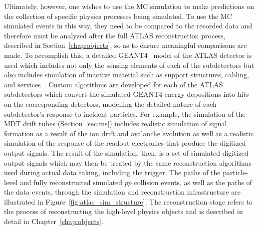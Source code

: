 Ultimately, however, one wishes to use the MC simulation to make predictions on the collection of specific physics
processes being simulated.
To use the MC simulated events in this way, they need to be compared to the recorded data and therefore must be analyzed after
the full ATLAS reconstruction process, described in Section~\ref{chap:objects}, so as to ensure meaningful comparisons are made.
To accomplish this, a detailed \textsc{GEANT4}~\cite{GEANT4} model of the ATLAS detector is used
which includes not only the sensing elements of each of the subdetectors but also includes
simulation of inactive material such as support structures, cabling, and services~\cite{ATLASSim}.
Custom algorithms are developed for each of the ATLAS subdetectors which convert the simulated \textsc{GEANT4}
energy depositions into hits on the corresponding detectors, modelling the detailed nature
of each subdetector's response to incident particles.
For example, the simulation of the MDT drift tubes (Section~\ref{sec:ms}) includes realistic simulation of signal formation as a result of the ion
drift and avalanche evolution as well as a realistic simulation of the response
of the readout electronics that produce the digitized output signals.
The result of the simulation, then, is a set of simulated digitized output signals which
may then be treated by the same reconstruction algorithms used during actual data taking, including the trigger.
The paths of the particle-level and fully reconstructed simulated $pp$ collision events, as well
as the paths of the data events, through the simulation and reconstruction infrastructure are illustrated in Figure~\ref{fig:atlas_sim_structure}.
The reconstruction stage refers to the process of reconstructing the high-level physics objects
and is described in detail in Chapter~\ref{chap:objects}.

